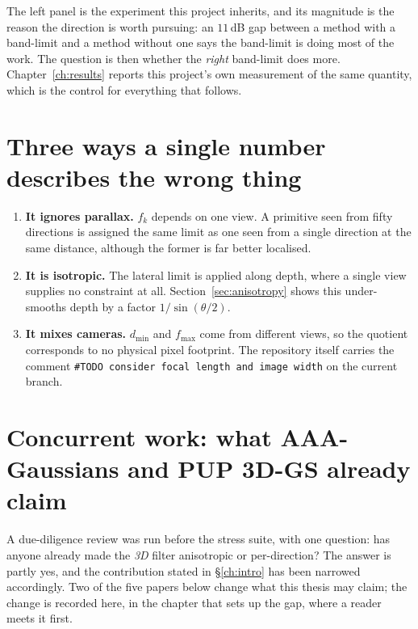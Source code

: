 The left panel is the experiment this project inherits, and its magnitude is the
reason the direction is worth pursuing: an $11$\,dB gap between a method with a
band-limit and a method without one says the band-limit is doing most of the
work. The question is then whether the \emph{right} band-limit does more.
Chapter~\ref{ch:results} reports this project's own measurement of the same
quantity, which is the control for everything that follows.

\section{Three ways a single number describes the wrong thing}
\label{sec:defects}

\begin{enumerate}[leftmargin=1.4em,itemsep=3pt]
  \item \textbf{It ignores parallax.} $f_k$ depends on one view. A primitive seen
        from fifty directions is assigned the same limit as one seen from a single
        direction at the same distance, although the former is far better
        localised.
  \item \textbf{It is isotropic.} The lateral limit is applied along depth, where
        a single view supplies no constraint at all.
        Section~\ref{sec:anisotropy} shows this under-smooths depth by a factor
        $1/\sin(\theta/2)$.
  \item \textbf{It mixes cameras.} $d_{\min}$ and $f_{\max}$ come from different
        views, so the quotient corresponds to no physical pixel footprint. The
        repository itself carries the comment
        \texttt{\#TODO consider focal length and image width} on the current
        branch.
\end{enumerate}

\section{Concurrent work: what AAA-Gaussians and PUP 3D-GS already claim}
\label{sec:relatedwork}

A due-diligence review was run before the stress suite, with one question: has
anyone already made the \emph{3D} filter anisotropic or per-direction? The answer
is partly yes, and the contribution stated in \S\ref{ch:intro} has been narrowed accordingly. Two of the five papers below change what this
thesis may claim; the change is recorded here, in the chapter that sets up the gap, where a reader meets it first.

